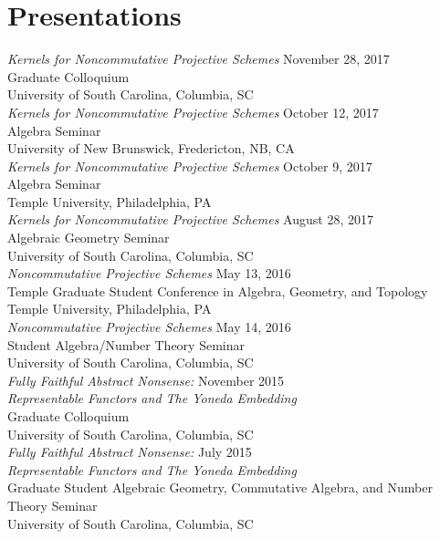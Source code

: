 \documentclass{article}
\begin{document}
  \section*{Presentations}
  \textsl{Kernels for Noncommutative Projective Schemes} \hfill November 28, 2017\\
  Graduate Colloquium\\
  University of South Carolina, Columbia, SC\\
  
  \noindent\textsl{Kernels for Noncommutative Projective Schemes} \hfill October 12, 2017\\
  Algebra Seminar\\
  University of New Brunswick, Fredericton, NB, CA\\
  
  \noindent\textsl{Kernels for Noncommutative Projective Schemes} \hfill October 9, 2017\\
  Algebra Seminar\\
  Temple University, Philadelphia, PA\\
  
  \noindent\textsl{Kernels for Noncommutative Projective Schemes} \hfill August 28, 2017\\
  Algebraic Geometry Seminar\\
  University of South Carolina, Columbia, SC\\
  
  \noindent\textsl{Noncommutative Projective Schemes} \hfill May 13, 2016\\
  Temple Graduate Student Conference in Algebra, Geometry, and Topology\\
  Temple University, Philadelphia, PA\\

  \noindent\textsl{Noncommutative Projective Schemes} \hfill May 14, 2016\\
  Student Algebra/Number Theory Seminar\\
  University of South Carolina, Columbia, SC\\

  \noindent\textsl{Fully Faithful Abstract Nonsense:} \hfill November 2015\\
  \textsl{Representable Functors and The Yoneda Embedding}\\
  Graduate Colloquium\\
  University of South Carolina, Columbia, SC\\

  \noindent\textsl{Fully Faithful Abstract Nonsense:} \hfill July 2015\\
  \textsl{Representable Functors and The Yoneda Embedding}\\
  Graduate Student Algebraic Geometry, Commutative Algebra, and Number Theory Seminar\\
  University of South Carolina, Columbia, SC
\end{document}
